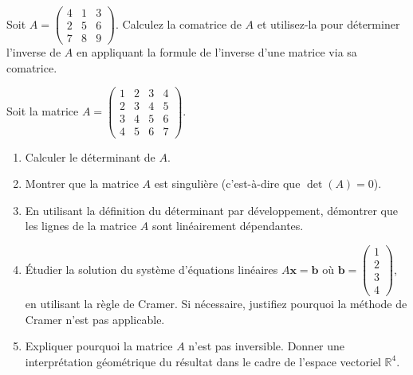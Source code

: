 \begin{exercice}
Soit \( A = \begin{pmatrix} 4 & 1 & 3 \\ 2 & 5 & 6 \\ 7 & 8 & 9 \end{pmatrix} \). Calculez la comatrice de \( A \) et utilisez-la pour déterminer l'inverse de \( A \) en appliquant la formule de l'inverse d'une matrice via sa comatrice.
\end{exercice}
\begin{exercice}

Soit la matrice \( A = \begin{pmatrix} 1 & 2 & 3 & 4 \\ 2 & 3 & 4 & 5 \\ 3 & 4 & 5 & 6 \\ 4 & 5 & 6 & 7 \end{pmatrix} \).

\begin{enumerate}
    \item Calculer le déterminant de \( A \).
    \item Montrer que la matrice \( A \) est singulière (c'est-à-dire que \( \det(A) = 0 \)).
    \item En utilisant la définition du déterminant par développement, démontrer que les lignes de la matrice \( A \) sont linéairement dépendantes.
    \item Étudier la solution du système d'équations linéaires \( A \mathbf{x} = \mathbf{b} \) où \( \mathbf{b} = \begin{pmatrix} 1 \\ 2 \\ 3 \\ 4 \end{pmatrix} \), en utilisant la règle de Cramer. Si nécessaire, justifiez pourquoi la méthode de Cramer n'est pas applicable.
    \item Expliquer pourquoi la matrice \( A \) n'est pas inversible. Donner une interprétation géométrique du résultat dans le cadre de l'espace vectoriel \( \mathbb{R}^4 \).
\end{enumerate}
\end{exercice}
